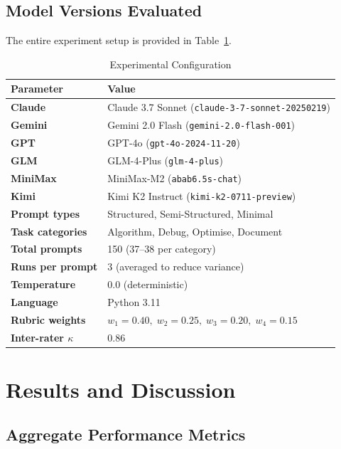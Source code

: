 \documentclass[conference]{IEEEtran}
\begin{document}
\subsection{Model Versions Evaluated}

The entire experiment setup is provided in Table~\ref{tab:params}.

\begin{table}[H]
\centering
\caption{Experimental Configuration}
\label{tab:params}
\renewcommand{\arraystretch}{1.3}
\begin{tabular}{>{\bfseries}p{2.4cm} p{5.2cm}}
\toprule
Parameter & Value \\
\midrule
Claude    & Claude 3.7 Sonnet (\texttt{claude-3-7-sonnet-20250219}) \\
Gemini    & Gemini 2.0 Flash (\texttt{gemini-2.0-flash-001}) \\
GPT       & GPT-4o (\texttt{gpt-4o-2024-11-20}) \\
GLM       & GLM-4-Plus (\texttt{glm-4-plus}) \\
MiniMax   & MiniMax-M2 (\texttt{abab6.5s-chat}) \\
Kimi      & Kimi K2 Instruct (\texttt{kimi-k2-0711-preview}) \\
Prompt types   & Structured, Semi-Structured, Minimal \\
Task categories & Algorithm, Debug, Optimise, Document \\
Total prompts  & 150 (37--38 per category) \\
Runs per prompt & 3 (averaged to reduce variance) \\
Temperature    & 0.0 (deterministic) \\
Language       & Python 3.11 \\
Rubric weights & $w_1{=}0.40,\;w_2{=}0.25,\;w_3{=}0.20,\;w_4{=}0.15$ \\
Inter-rater $\kappa$ & 0.86 \\
\bottomrule
\end{tabular}
\end{table}

\section{Results and Discussion}
\label{sec:results}

\subsection{Aggregate Performance Metrics}
\end{document}
